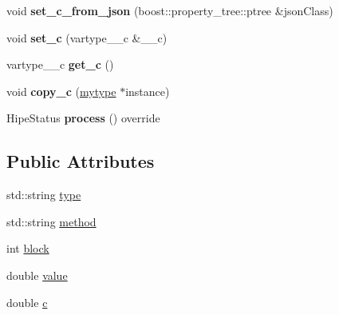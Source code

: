 \begin{DoxyCompactItemize}
\item 
\mbox{\label{classfilter_1_1algos_1_1_binary_adaptive_a0c82b3e231c3f5e4d820d408bde2d0c4}} 
void {\bfseries set\+\_\+c\+\_\+from\+\_\+json} (boost\+::property\+\_\+tree\+::ptree \&json\+Class)
\item 
\mbox{\label{classfilter_1_1algos_1_1_binary_adaptive_adaf84bcdf3380d958f1236e98cc85bcd}} 
void {\bfseries set\+\_\+c} (vartype\+\_\+\+\_\+c \&\+\_\+\+\_\+c)
\item 
\mbox{\label{classfilter_1_1algos_1_1_binary_adaptive_a34b11512baec0cfffc7b5b679acd08d9}} 
vartype\+\_\+\+\_\+c {\bfseries get\+\_\+c} ()
\item 
\mbox{\label{classfilter_1_1algos_1_1_binary_adaptive_acd8a25c3670e064aba1fed85d76d2e80}} 
void {\bfseries copy\+\_\+c} (\hyperlink{classfilter_1_1algos_1_1_binary_adaptive}{mytype} $\ast$instance)
\item 
\mbox{\label{classfilter_1_1algos_1_1_binary_adaptive_a9026458211dd46de236a1addcd0903be}} 
Hipe\+Status {\bfseries process} () override
\end{DoxyCompactItemize}
\subsection*{Public Attributes}
\begin{DoxyCompactItemize}
\item 
std\+::string \hyperlink{classfilter_1_1algos_1_1_binary_adaptive_a8256a8c340fbc64eaf1fa4232d910435}{type}
\item 
std\+::string \hyperlink{classfilter_1_1algos_1_1_binary_adaptive_a67df7719f9d5ace093fb1b70455f7a4f}{method}
\item 
int \hyperlink{classfilter_1_1algos_1_1_binary_adaptive_ad36a47f5f1a5cc2b78f17ab842e31487}{block}
\item 
double \hyperlink{classfilter_1_1algos_1_1_binary_adaptive_ae61f0f9c3449d7025d88508445005cc7}{value}
\item 
double \hyperlink{classfilter_1_1algos_1_1_binary_adaptive_acce86b4d7f1370bc36cd283dcc26970c}{c}
\end{DoxyCompactItemize}
